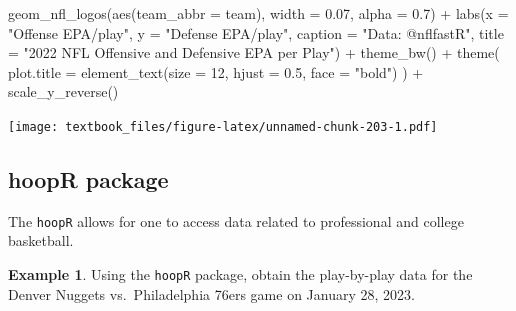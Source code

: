 \documentclass[
  11pt,
]{book}
\newenvironment{Shaded}{\begin{snugshade}}{\end{snugshade}}
\newcommand{\AttributeTok}[1]{\textcolor[rgb]{0.77,0.63,0.00}{#1}}
\newcommand{\DecValTok}[1]{\textcolor[rgb]{0.00,0.00,0.81}{#1}}
\newcommand{\FloatTok}[1]{\textcolor[rgb]{0.00,0.00,0.81}{#1}}
\newcommand{\FunctionTok}[1]{\textcolor[rgb]{0.00,0.00,0.00}{#1}}
\newcommand{\NormalTok}[1]{#1}
\newcommand{\SpecialCharTok}[1]{\textcolor[rgb]{0.00,0.00,0.00}{#1}}
\newcommand{\StringTok}[1]{\textcolor[rgb]{0.31,0.60,0.02}{#1}}
\theoremstyle{definition}
\theoremstyle{definition}
\newtheorem{example}{Example}[chapter]
\theoremstyle{definition}
\theoremstyle{definition}
\theoremstyle{remark}
\begin{document}
\begin{Shaded}
\begin{Highlighting}[]
  \FunctionTok{geom\_nfl\_logos}\NormalTok{(}\FunctionTok{aes}\NormalTok{(}\AttributeTok{team\_abbr =}\NormalTok{ team), }\AttributeTok{width =} \FloatTok{0.07}\NormalTok{, }\AttributeTok{alpha =} \FloatTok{0.7}\NormalTok{) }\SpecialCharTok{+}
  \FunctionTok{labs}\NormalTok{(}\AttributeTok{x =} \StringTok{"Offense EPA/play"}\NormalTok{, }\AttributeTok{y =} \StringTok{"Defense EPA/play"}\NormalTok{, }\AttributeTok{caption =} \StringTok{"Data: @nflfastR"}\NormalTok{,}
    \AttributeTok{title =} \StringTok{"2022 NFL Offensive and Defensive EPA per Play"}\NormalTok{) }\SpecialCharTok{+}
  \FunctionTok{theme\_bw}\NormalTok{() }\SpecialCharTok{+}
  \FunctionTok{theme}\NormalTok{( }\AttributeTok{plot.title =} \FunctionTok{element\_text}\NormalTok{(}\AttributeTok{size =} \DecValTok{12}\NormalTok{, }\AttributeTok{hjust =} \FloatTok{0.5}\NormalTok{, }\AttributeTok{face =} \StringTok{"bold"}\NormalTok{) ) }\SpecialCharTok{+}
  \FunctionTok{scale\_y\_reverse}\NormalTok{()}
\end{Highlighting}
\end{Shaded}

\texttt{[image: textbook\_files/figure-latex/unnamed-chunk-203-1.pdf]}

\newpage

\hypertarget{hoopr-package}{%
\subsection{hoopR package}\label{hoopr-package}}

The \texttt{hoopR} allows for one to access data related to professional and college basketball.

\begin{example}
Using the \texttt{hoopR} package, obtain the play-by-play data for the Denver Nuggets vs.~Philadelphia 76ers game on January 28, 2023.
\end{example}
\end{document}
